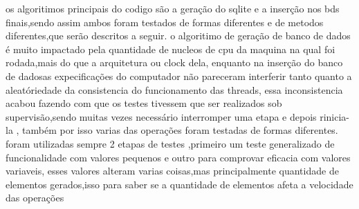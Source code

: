 \documentclass[
	12pt,				%
	openright,			%
	oneside,			%
	a4paper,			%
	english,			%
	french,				%
	spanish,			%
	brazil,				%
	]{abntex2}
\begin{document}
os algoritimos principais do codigo são a geração do sqlite e a inserção nos bds finais,sendo assim ambos foram testados de formas diferentes e de metodos diferentes,que serão descritos a seguir.
o algoritimo de geração de banco de dados é muito impactado pela quantidade de nucleos de cpu da maquina na qual foi rodada,mais do que a arquitetura ou clock dela,
enquanto na inserção do banco de dadosas expecificações do computador não pareceram interferir tanto quanto a aleatóriedade da consistencia do funcionamento das threads,
essa inconsistencia acabou fazendo com que os testes tivessem que ser realizados sob supervisão,sendo muitas vezes necessário interromper uma etapa e depois rinicia-la ,
também por isso varias das operações foram testadas de formas diferentes.
foram utilizadas sempre 2 etapas de testes ,primeiro um teste generalizado de funcionalidade com valores pequenos e outro para comprovar eficacia com valores variaveis,
esses valores alteram varias coisas,mas principalmente quantidade de elementos gerados,isso para saber se a quantidade de elementos afeta a velocidade das operações
\end{document}
